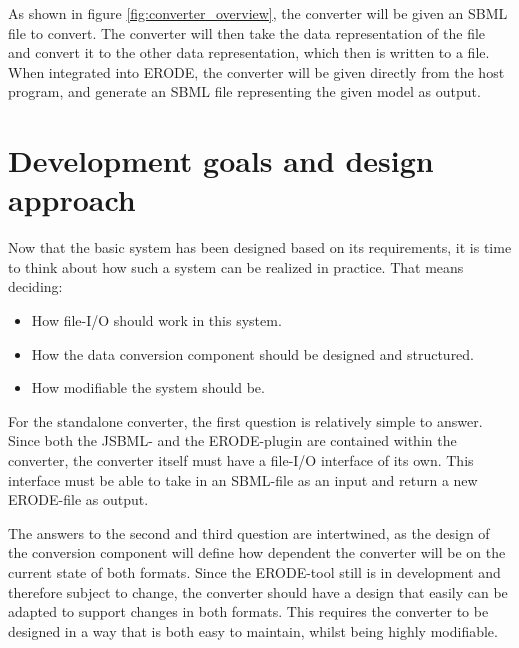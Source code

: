 As shown in figure \ref{fig:converter_overview}, the converter will be given an SBML file to convert. The converter will then take the data representation of the file and convert it to the other data representation, which then is written to a file. When integrated into ERODE, the converter will be given directly from the host program, and generate an SBML file representing the given model as output.

\section{Development goals and design approach}
Now that the basic system has been designed based on its requirements, it is time to think about how such a system can be realized in practice. That means deciding:
\begin{itemize}
    \item How file-I/O should work in this system.
    \item How the data conversion component should be designed and structured.
    \item How modifiable the system should be.
\end{itemize}
For the standalone converter, the first question is relatively simple to answer. Since both the JSBML- and the ERODE-plugin are contained within the converter, the converter itself must have a file-I/O interface of its own. This interface must be able to take in an SBML-file as an input and return a new ERODE-file as output.

The answers to the second and third question are intertwined, as the design of the conversion component will define how dependent the converter will be on the current state of both formats. Since the ERODE-tool still is in development and therefore subject to change, the converter should have a design that easily can be adapted to support changes in both formats. This requires the converter to be designed in a way that is both easy to maintain, whilst being highly modifiable.


